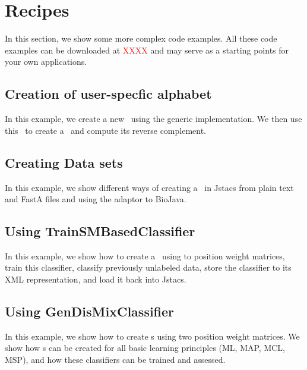 \section{Recipes}


In this section, we show some more complex code examples. All these code examples can be downloaded at \textcolor{red}{XXXX} and may serve as a starting points for your own applications.

\subsection{Creation of user-specfic alphabet}
In this example, we create a new \ComplementableDiscreteAlphabet~using the generic implementation. We then use this \Alphabet~to create a \Sequence~and compute its reverse complement.
\renewcommand{\codefile}{./recipes/AlphabetCreation.java}
\setcounter{off}{33}

\subsection{Creating Data sets}
In this example, we show different ways of creating a \DataSet~in Jstacs from plain text and FastA files and using the adaptor to BioJava.
\renewcommand{\codefile}{./recipes/DataLoader.java}
\setcounter{off}{42}

\subsection{Using TrainSMBasedClassifier}
In this example, we show how to create a \TrainSMBasedClassifier~using to position weight matrices, train this classifier, classify previously unlabeled data, store the classifier to its XML representation, and load it back into Jstacs.
\renewcommand{\codefile}{./recipes/TrainSMBasedClassifierTest.java}
\setcounter{off}{53}

\subsection{Using GenDisMixClassifier}
In this example, we show how to create \GenDisMixClassifier s using two position weight matrices. We show how \GenDisMixClassifier s can be created for all basic learning principles (ML, MAP, MCL, MSP), and how these classifiers can be trained and assessed.
\renewcommand{\codefile}{./recipes/GenDisMixClassifierTest.java}
\setcounter{off}{54}

